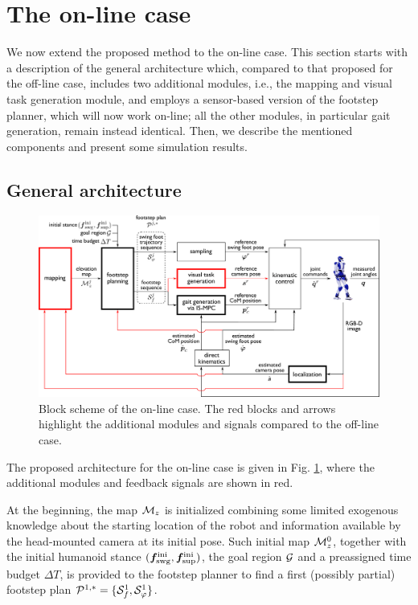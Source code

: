 \section{The on-line case} 
\label{sec:WoS:onlineCase}

We now extend the proposed method to the on-line case.
This section starts with a description of the general architecture which,
compared to that proposed for the off-line case, includes two additional
modules, i.e., the mapping and visual task generation module, and employs a
sensor-based version of the footstep planner, which will now work on-line; all
the other modules, in particular gait generation, remain instead identical.  
Then, we describe the mentioned components and present some simulation results.

\subsection{General architecture}
\label{sec:WoS:onlineCase:GeneralArchitecture}
\begin{figure}
\centering
\includegraphics[width=\textwidth]{figures/BlockSchemeOnline.pdf}
\caption{Block scheme of the on-line case. The red blocks and arrows highlight
    the additional modules and signals compared to the off-line case.}
\label{fig:WoS:blockScheme2}
\end{figure}

The proposed architecture for the on-line case is given in
Fig. \ref{fig:WoS:blockScheme2}, where the additional modules and feedback
signals are shown in red.

At the beginning, the map ${\cal M}_z$ is initialized combining some limited
exogenous knowledge about the starting location of the robot and information
available by the head-mounted camera at its initial pose. Such initial map
${\cal M}_z^0$, together with the initial humanoid stance
$({\bm{f}}_{\rm swg}^{\rm ini}, {\bm{f}}_{\rm sup}^{\rm ini})$, the goal region
$\cal G$ and a preassigned time budget $\Delta T$, is provided to the footstep
planner to find a first (possibly partial) footstep plan
${\cal P}^{1,*} = \{ {\cal S}_f^{1}, {\cal S}_\varphi^{1} \}$.

